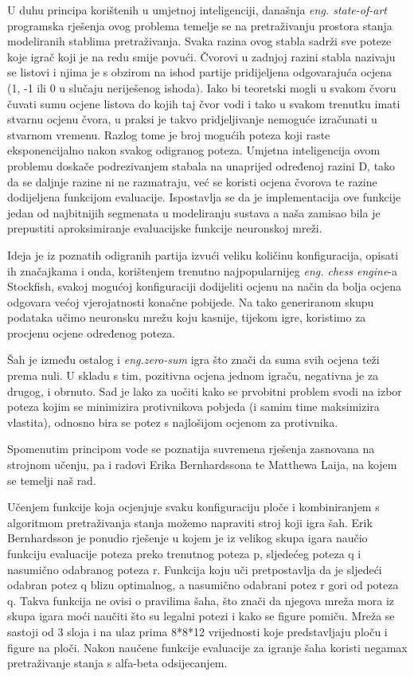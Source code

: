 \documentclass[journal]{IEEEtran}
\begin{document}
U duhu principa korištenih u umjetnoj inteligenciji, današnja \textit{eng. state-of-art} programska rješenja ovog problema temelje se na pretraživanju prostora stanja modeliranih stablima pretraživanja. Svaka razina ovog stabla sadrži sve poteze koje igrač koji je na redu smije povući. Čvorovi u zadnjoj razini stabla nazivaju se listovi i njima je s obzirom na ishod partije pridijeljena odgovarajuća ocjena (1, -1 ili 0 u slučaju neriješenog ishoda). Iako bi teoretski mogli u svakom čvoru čuvati sumu ocjene listova do kojih taj čvor vodi i tako u svakom trenutku imati stvarnu ocjenu čvora, u praksi je takvo pridjeljivanje nemoguće izračunati u stvarnom vremenu. Razlog tome je broj mogućih poteza koji raste eksponencijalno nakon svakog odigranog poteza. Umjetna inteligencija ovom problemu doskače podrezivanjem stabala na unaprijed određenoj razini D, tako da se daljnje razine ni ne razmatraju, već se koristi ocjena čvorova te razine dodijeljena funkcijom evaluacije. Ispostavlja se da je implementacija ove funkcije jedan od najbitnijih segmenata u modeliranju sustava a naša zamisao bila je prepustiti aproksimiranje evaluacijske funkcije neuronskoj mreži.

Ideja je iz poznatih odigranih partija izvući veliku količinu konfiguracija, opisati ih značajkama i onda, korištenjem trenutno najpopularnijeg \textit{eng. chess engine}-a Stockfish, svakoj mogućoj konfiguraciji dodijeliti ocjenu na način da bolja ocjena odgovara većoj vjerojatnosti konačne pobijede. Na tako generiranom skupu podataka učimo neuronsku mrežu koju kasnije, tijekom igre, koristimo za procjenu ocjene određenog poteza.

Šah je između ostalog i \textit{eng.zero-sum} igra što znači da suma svih ocjena teži prema nuli. U skladu s tim, pozitivna ocjena jednom igraču, negativna je za drugog, i obrnuto. Sad je lako za uočiti kako se prvobitni problem svodi na izbor poteza kojim se minimizira protivnikova pobjeda (i samim time maksimizira vlastita), odnosno bira se potez s najlošijom ocjenom za protivnika.

Spomenutim principom vode se poznatija suvremena rješenja zasnovana na strojnom učenju, pa i radovi Erika Bernhardssona te Matthewa Laija, na kojem se temelji naš rad.

Učenjem funkcije koja ocjenjuje svaku konfiguraciju ploče i kombiniranjem s algoritmom pretraživanja stanja možemo napraviti stroj koji igra šah. Erik Bernhardsson je ponudio rješenje u kojem je iz velikog skupa igara naučio funkciju evaluacije poteza preko trenutnog poteza p, sljedećeg poteza q i nasumično odabranog poteza r. Funkcija koju uči pretpostavlja da je sljedeći odabran potez q blizu optimalnog, a nasumično odabrani potez r gori od poteza q. Takva funkcija ne ovisi o pravilima šaha, što znači da njegova mreža mora iz skupa igara moći naučiti što su legalni potezi i kako se figure pomiču. Mreža se sastoji od 3 sloja i na ulaz prima 8*8*12 vrijednosti koje predstavljaju ploču i figure na ploči. Nakon naučene funkcije evaluacije za igranje šaha koristi negamax pretraživanje stanja s alfa-beta odsijecanjem.
\end{document}
